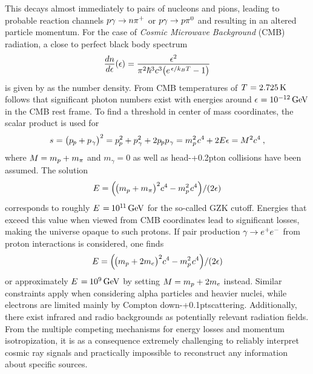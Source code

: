 This decays almost immediately to pairs of nucleons and pions, leading to probable reaction channels
$p\gamma \rightarrow \kern-0.1pt n\smash{\pi^+}$ or $p\gamma \rightarrow \kern+0.2pt p \smash{\pi^0}$ and resulting in an altered
particle momentum. For the case of \emph{Cosmic Microwave Background} (CMB) radiation, a close to perfect black
body spectrum
\begin{equation*}
	\frac{\raisebox{-0.3ex}{$dn$}}{\raisebox{0.15ex}{$d\epsilon$}} (\epsilon) \kern+0.2pt =
	\frac{\raisebox{-0.3ex}{$\epsilon^2$}}{\pi^2 \hbar^3 c^3 \bigl( e^{\kern+1.0pt \epsilon / k_B T} - 1 \bigr)}
\end{equation*}
is given by \cite{Gaisser_2016} as the number density. From CMB temperatures of $\kern+0.5pt T \kern+0.5pt = \qty{2.725}{\kelvin}$ follows that
significant photon numbers exist with energies around $\epsilon \kern+0.5pt = \qty{e-12}{\giga\electronvolt}$ in the CMB rest frame. 
To find a threshold in center of mass coordinates, the scalar product is used for
\begin{equation*}
	s \kern+0.3pt = \bigl( p_{\kern-0.5pt p} + p_{\kern+0.5pt \gamma} \bigr)^2 =
	p_{\kern-0.5pt p}^2 + p_{\kern+0.5pt \gamma}^2 + 2 p_{\kern-0.5pt p} p_{\kern+0.5pt \gamma} =
	m_p^2 \kern+0.8pt c^4 \kern-0.2pt + 2 E \epsilon = \kern-0.2pt M^2c^4 \: ,
\end{equation*}
where $M \kern-0.3pt = m_p + \kern+0.3pt m_\pi$ and $m_\gamma = 0$ as well as head-{\kern+0.2pt}on collisions have been assumed. The solution
\begin{equation*}
	E = \Bigl( \kern-1.0pt \bigl( m_p + m_\pi \bigr)^2 c^4 \kern-0.2pt - m_p^2 \kern+0.8pt c^4 \Bigr) / (2\epsilon)
\end{equation*}
corresponds to roughly $E \kern+1.0pt = \kern-0.5pt 10^{1 \kern-0.3pt 1} \kern+1.5pt \unit{\giga\electronvolt}$ for the so-called
GZK cutoff. Energies that exceed this value when viewed from CMB coordinates lead to significant losses, making the universe
opaque to such protons. If pair production $\gamma \kern-0.5pt \rightarrow \smash{e^+ \kern-0.5pt e^-}$ from proton interactions is
considered, one finds
\begin{equation*}
	E = \Bigl( \kern-1.0pt \bigl( m_p + 2m_e \bigr)^2 c^4 \kern-0.2pt - m_p^2 \kern+0.8pt c^4 \Bigr) / (2\epsilon)
\end{equation*}
or approximately $E \kern+1.0pt = \kern-0.5pt \qty{e+9}{\giga\electronvolt}$ by setting $M \kern-0.3pt = m_p + \kern+0.3pt 2m_e$
instead. Similar constraints apply when considering alpha particles and heavier nuclei, while electrons are limited mainly by Compton
down-{\kern+0.1pt}scattering. Additionally, there exist infrared and radio backgrounds as potentially relevant radiation fields. From
the multiple competing mechanisms for energy losses and momentum isotropization, it is as a consequence extremely challenging
to reliably interpret cosmic ray signals and practically impossible to reconstruct any information about specific sources.



